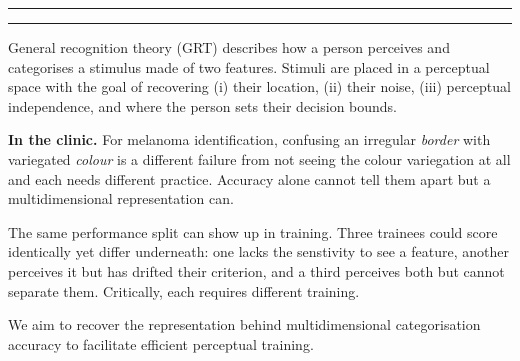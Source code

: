 \documentclass[final]{article}
\newlength{\colw}
\begin{document}
\vspace{0.1in}
{\color{gink}\rule{\textwidth}{6pt}}
\vspace{0.18in}

\noindent

\vspace{0.16in}
{\color{gmute}\rule{\textwidth}{2pt}}
\vspace{0.16in}

\noindent
\begin{minipage}[t]{\colw}

{\bodyfont
General recognition theory (GRT) describes how a person perceives and categorises a stimulus made of two features.
Stimuli are placed in a perceptual space with the goal of recovering (i) their location, (ii) their noise, (iii) perceptual independence, and where the person sets their decision bounds.\par\medskip\medskip}

\begin{callout}
\textbf{In the clinic.} For melanoma identification, confusing an irregular \emph{border} with variegated \emph{colour} is a different failure from not seeing the colour variegation at all and each needs different practice. Accuracy alone cannot tell them apart but a multidimensional representation can.\medskip
\end{callout}

{\bodyfont
The same performance split can show up in training. Three trainees could score identically yet differ underneath: one lacks the senstivity to see a feature, another perceives it but has drifted their criterion, and a third perceives both but cannot separate them. Critically, each requires different training.
\par\medskip\medskip}

{\bodyfont
We aim to recover the representation behind multidimensional categorisation accuracy to facilitate efficient perceptual training.\par}


\end{minipage}%
\end{document}
